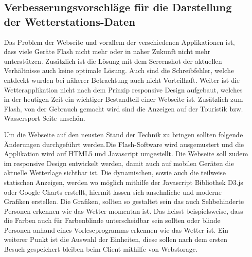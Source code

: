 


\subsection{Verbesserungsvorschläge für die Darstellung der Wetterstations-Daten}
Das Problem der Webseite und vorallem der verschiedenen Applikationen ist, dass viele Geräte Flash nicht mehr oder in naher Zukunft nicht mehr unterstützen. Zusätzlich ist die Lösung mit dem Screenshot der aktuellen Verhältnisse auch keine optimale Lösung. Auch sind die Schreibfehler, welche entdeckt wurden bei näherer Betrachtung auch nicht Vorteilhaft. Weiter ist die Wetterapplikation nicht nach dem Prinzip responsive Design aufgebaut, welches in der heutigen Zeit ein wichtiger Bestandteil einer Webseite ist. Zusätzlich zum Flash, von der Gebrauch gemacht wird sind die Anzeigen auf der Touristik bzw. Wassersport Seite unschön. 

Um die Webseite auf den neusten Stand der Technik zu bringen sollten folgende Änderungen durchgeführt werden.Die Flash-Software wird ausgemustert und die Applikation wird auf HTML5 und Javascript umgestellt. Die Webseite soll zudem im responsive Design entwickelt werden, damit auch auf mobilen Geräten die aktuelle Wetterlage sichtbar ist. Die dynamischen, sowie auch die teilweise statischen Anzeigen, werden wo möglich mithilfe der Javascript Bibliothek D3.js oder Google Charts erstellt, hiermit lassen sich ansehnliche und moderne Grafiken erstellen. Die Grafiken, sollten so gestaltet sein das auch Sehbehinderte Personen erkennen wie das Wetter momentan ist. Das heisst beispielsweise, dass die Farben auch für Farbenblinde unterscheidbar sein sollten oder blinde Personen anhand eines Vorleseprogramms erkennen wie das Wetter ist. Ein weiterer Punkt ist die Auswahl der Einheiten, diese sollen nach dem ersten Besuch gespeichert bleiben beim Client mithilfe von Webstorage.

